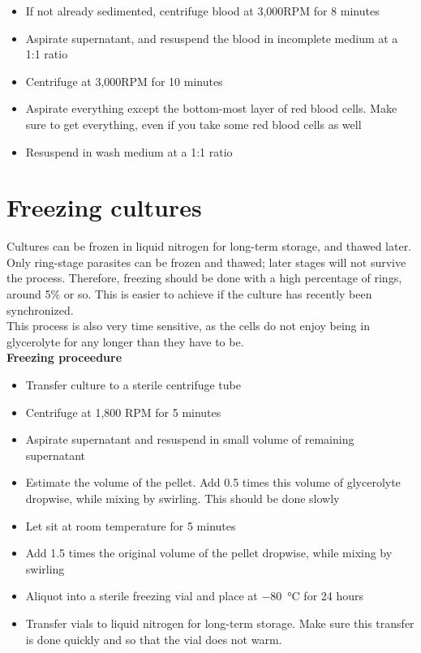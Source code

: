 \documentclass{article}
\begin{document}
\begin{itemize}
	\item If not already sedimented, centrifuge blood at 3,000RPM for 8 minutes
	\item Aspirate supernatant, and resuspend the blood in incomplete medium at a 1:1 ratio
	\item Centrifuge at 3,000RPM for 10 minutes
	\item Aspirate everything except the bottom-most layer of red blood cells. Make sure to get everything, even if you take some red blood cells as well
	\item Resuspend in wash medium at a 1:1 ratio
\end{itemize}


\section{Freezing cultures}

Cultures can be frozen in liquid nitrogen for long-term storage, and thawed later.\\

Only ring-stage parasites can be frozen and thawed; later stages will not survive the process. Therefore, freezing should be done with a high percentage of rings, around 5\% or so. This is easier to achieve if the culture has recently been synchronized.\\

This process is also very time sensitive, as the cells do not enjoy being in glycerolyte for any longer than they have to be.\\

\textbf{Freezing proceedure}

\begin{itemize}
	\item Transfer culture to a sterile centrifuge tube
	\item Centrifuge at 1,800 RPM for 5 minutes
	\item Aspirate supernatant and resuspend in small volume of remaining supernatant
	\item Estimate the volume of the pellet. Add 0.5 times this volume of glycerolyte dropwise, while mixing by swirling. This should be done slowly
	\item Let sit at room temperature for 5 minutes
	\item Add 1.5 times the original volume of the pellet dropwise, while mixing by swirling
	\item Aliquot into a sterile freezing vial and place at \SI{-80}{\celsius} for 24 hours
	\item Transfer vials to liquid nitrogen for long-term storage. Make sure this transfer is done quickly and so that the vial does not warm.
\end{itemize}
\end{document}
